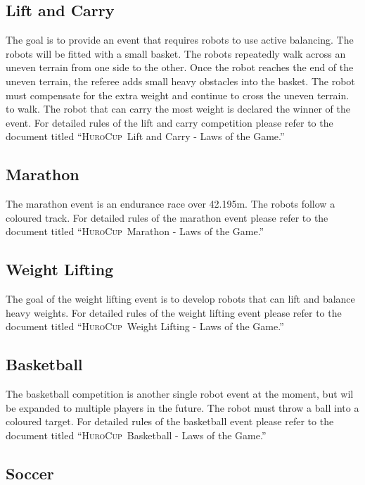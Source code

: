 \documentclass[12pt]{article}
\newcommand{\HuroCup}{\textsc{HuroCup}}
\begin{document}
\subsection{Lift and Carry}
\label{subsec:lift-and-carry}

The goal is to provide an event that requires robots to use active
balancing. The robots will be fitted with a small basket. The robots
repeatedly walk across an uneven terrain from one side to the
other. Once the robot reaches the end of the uneven terrain, the
referee adds small heavy obstacles into the basket. The robot must
compensate for the extra weight and continue to cross the uneven
terrain.  to walk. The robot that can carry the most weight is
declared the winner of the event. For detailed rules of the lift and
carry competition please refer to the document titled ``\HuroCup\ Lift
and Carry - Laws of the Game.''

\subsection{Marathon}
\label{subsec:marathon}

The marathon event is an endurance race over 42.195m. The robots
follow a coloured track. For detailed rules of the marathon event
please refer to the document titled ``\HuroCup\ Marathon - Laws of the
Game.''

\subsection{Weight Lifting}
\label{subsec:weight-lifting}

The goal of the weight lifting event is to develop robots that can
lift and balance heavy weights. For detailed rules of the weight
lifting event please refer to the document titled ``\HuroCup\ Weight
Lifting - Laws of the Game.''

\subsection{Basketball}
\label{subsec:basketball}

The basketball competition is another single robot event at the
moment, but wil be expanded to multiple players in the future. The
robot must throw a ball into a coloured target. For detailed rules of
the basketball event please refer to the document titled ``\HuroCup\
Basketball - Laws of the Game.''

\subsection{Soccer}
\label{subsec:soccer}
\end{document}

